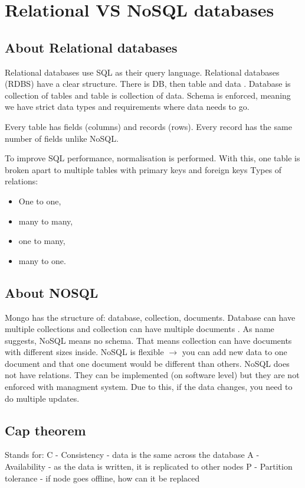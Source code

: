 \section{Relational VS NoSQL databases}

\subsection{About Relational databases}
Relational databases use SQL as their query language.
Relational databases (RDBS) have a clear structure. There is DB, then table and data \parencite{web:MSDatabases}. Database is collection of tables and table is collection of data. Schema is enforced, meaning we have strict data types and requirements where data needs to go.

Every table has fields (columns) and records (rows). Every record has the same number of fields unlike NoSQL.

To improve SQL performance, normalisation is performed. With this, one table is broken apart to multiple tables with primary keys and foreign keys \parencite{kohler2018sql}
\newline
Types of relations:
\begin{itemize}
  \item One to one,
  \item many to many,
  \item one to many,
  \item many to one.
\end{itemize}

\subsection{About NOSQL}
Mongo has the structure of: database, collection, documents. Database can have multiple collections and collection can have multiple documents \parencite{web:AboutMongo}. As name suggests, NoSQL means no schema. That means collection can have documents with different sizes inside.
\newline
NoSQL is flexible ${\xrightarrow{}}$ you can add new data to one document and that one document would be different than others\parencite{web:MongoNoSQL}.
\newline
NoSQL does not have relations. They can be implemented (on software level) but they are not enforced with managment system. Due to this, if the data changes, you need to do multiple updates.

\subsection{Cap theorem}
Stands for:
\newline
C - Consistency - data is the same across the database
\newline
A - Availability - as the data is written, it is replicated to other nodes
\newline
P - Partition tolerance - if node goes offline, how can it be replaced
\newline
\parencite{khazaei2016choose}


